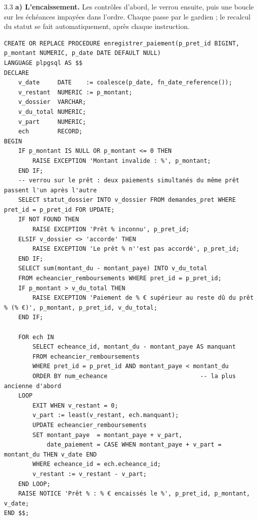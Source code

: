 \begin{correction}{3.3}
\textbf{a) L'encaissement.} Les contrôles d'abord, le verrou ensuite, puis une boucle sur les échéances
impayées dans l'ordre. Chaque  passe par le gardien ; le recalcul du statut se fait
automatiquement, après chaque instruction.
\begin{lstlisting}[style=long]
CREATE OR REPLACE PROCEDURE enregistrer_paiement(p_pret_id BIGINT, p_montant NUMERIC, p_date DATE DEFAULT NULL)
LANGUAGE plpgsql AS $$
DECLARE
    v_date     DATE    := coalesce(p_date, fn_date_reference());
    v_restant  NUMERIC := p_montant;
    v_dossier  VARCHAR;
    v_du_total NUMERIC;
    v_part     NUMERIC;
    ech        RECORD;
BEGIN
    IF p_montant IS NULL OR p_montant <= 0 THEN
        RAISE EXCEPTION 'Montant invalide : %', p_montant;
    END IF;
    -- verrou sur le prêt : deux paiements simultanés du même prêt passent l'un après l'autre
    SELECT statut_dossier INTO v_dossier FROM demandes_pret WHERE pret_id = p_pret_id FOR UPDATE;
    IF NOT FOUND THEN
        RAISE EXCEPTION 'Prêt % inconnu', p_pret_id;
    ELSIF v_dossier <> 'accorde' THEN
        RAISE EXCEPTION 'Le prêt % n''est pas accordé', p_pret_id;
    END IF;
    SELECT sum(montant_du - montant_paye) INTO v_du_total
    FROM echeancier_remboursements WHERE pret_id = p_pret_id;
    IF p_montant > v_du_total THEN
        RAISE EXCEPTION 'Paiement de % € supérieur au reste dû du prêt % (% €)', p_montant, p_pret_id, v_du_total;
    END IF;

    FOR ech IN
        SELECT echeance_id, montant_du - montant_paye AS manquant
        FROM echeancier_remboursements
        WHERE pret_id = p_pret_id AND montant_paye < montant_du
        ORDER BY num_echeance                          -- la plus ancienne d'abord
    LOOP
        EXIT WHEN v_restant = 0;
        v_part := least(v_restant, ech.manquant);
        UPDATE echeancier_remboursements
        SET montant_paye  = montant_paye + v_part,
            date_paiement = CASE WHEN montant_paye + v_part = montant_du THEN v_date END
        WHERE echeance_id = ech.echeance_id;
        v_restant := v_restant - v_part;
    END LOOP;
    RAISE NOTICE 'Prêt % : % € encaissés le %', p_pret_id, p_montant, v_date;
END $$;
\end{lstlisting}


\end{correction}
